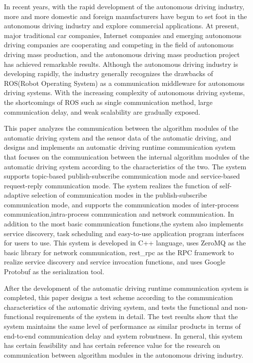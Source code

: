\begin{abstract*}
  In recent years, with the rapid development of the autonomous driving industry,
  more and more domestic and foreign manufacturers have begun to set foot in the autonomous driving industry and explore commercial applications.
  At present, major traditional car companies, Internet companies and emerging autonomous driving companies are cooperating and competing in the field of autonomous driving mass production,
  and the autonomous driving mass production project has achieved remarkable results.
  Although the autonomous driving industry is developing rapidly,
  the industry generally recognizes the drawbacks of ROS(Robot Operating System) as a communication middleware for autonomous driving systems.
  With the increasing complexity of autonomous driving systems,
  the shortcomings of ROS such as single communication method,
  large communication delay, and weak scalability are gradually exposed.

  This paper analyzes the communication between the algorithm modules of the automatic driving system and the sensor data of the automatic driving,
  and designs and implements an automatic driving runtime communication system that focuses on the communication between the internal algorithm modules of the automatic driving system according to the characteristics of the two.
  The system supports topic-based publish-subscribe communication mode and service-based request-reply communication mode. The system realizes the function of self-adaptive selection of communication modes in the publish-subscribe communication mode,
  and supports the communication modes of inter-process communication,intra-process communication and network communication.
  In addition to the most basic communication functions,the system also implements service discovery,
  task scheduling and easy-to-use application program interfaces for users to use. This system is developed in C++ language,
  uses ZeroMQ as the basic library for network communication, rest\_rpc as the RPC framework to realize service discovery and service invocation functions,
  and uses Google Protobuf as the serialization tool.

  After the development of the automatic driving runtime communication system is completed,
  this paper designs a test scheme according to the communication characteristics of the automatic driving system,
  and tests the functional and non-functional requirements of the system in detail.
  The test results show that the system maintains the same level of performance as similar products in terms of end-to-end communication delay and system robustness.
  In general, this system has certain feasibility and has certain reference value for the research on communication between algorithm modules in the autonomous driving industry.
\end{abstract*}
